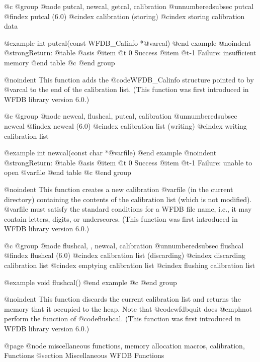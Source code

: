 {{{{{{{{@c @group
@node    putcal, newcal, getcal, calibration
@unnumberedsubsec putcal
@findex putcal (6.0)
@cindex calibration (storing)
@cindex storing calibration data

@example
int putcal(const WFDB_Calinfo *@var{cal})
@end example
@noindent
@strong{Return:}
@table @asis
@item @t{ 0}
Success
@item @t{-1}
Failure: insufficient memory
@end table
@c @end group

@noindent
This function adds the @code{WFDB_Calinfo} structure pointed to by @var{cal}
to the end of the calibration list.  (This function was first introduced
in WFDB library version 6.0.)

@c @group
@node    newcal, flushcal, putcal, calibration
@unnumberedsubsec newcal
@findex newcal (6.0)
@cindex calibration list (writing)
@cindex writing calibration list

@example
int newcal(const char *@var{file})
@end example
@noindent
@strong{Return:}
@table @asis
@item @t{ 0}
Success
@item @t{-1}
Failure: unable to open @var{file}
@end table
@c @end group

@noindent
This function creates a new calibration @var{file} (in the current
directory) containing the contents of the calibration list (which is not
modified).  @var{file} must satisfy the standard conditions for a WFDB
file name, i.e., it may contain letters, digits, or underscores.  (This
function was first introduced in WFDB library version 6.0.)

@c @group
@node    flushcal, , newcal, calibration
@unnumberedsubsec flushcal
@findex flushcal (6.0)
@cindex calibration list (discarding)
@cindex discarding calibration list
@cindex emptying calibration list
@cindex flushing calibration list

@example
void flushcal()
@end example
@c @end group

@noindent
This function discards the current calibration list and returns the
memory that it occupied to the heap.  Note that @code{wfdbquit} does
@emph{not} perform the function of @code{flushcal}.  (This function was
first introduced in WFDB library version 6.0.)

@page
@node miscellaneous functions, memory allocation macros, calibration, Functions
@section Miscellaneous WFDB Functions

}}}}}}}}

